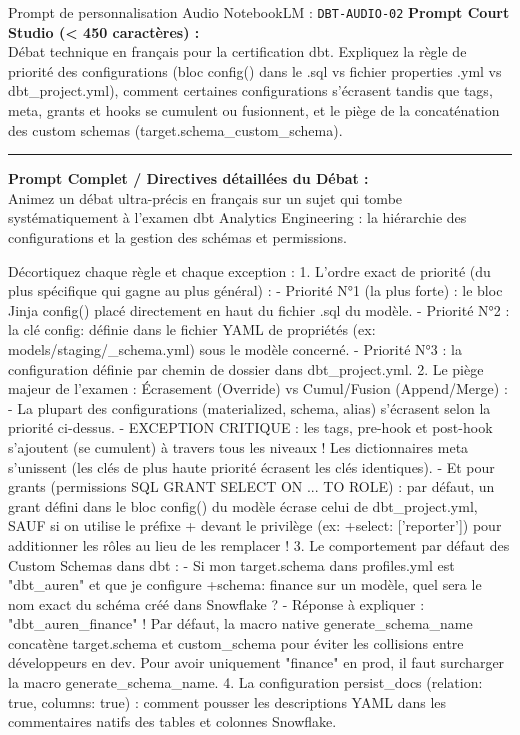 \documentclass[11pt,a4paper]{article}
\begin{document}
\begin{promptbox}{Prompt de personnalisation Audio NotebookLM : \texttt{DBT-AUDIO-02}}
\textbf{Prompt Court Studio (< 450 caractères) :}\\
Débat technique en français pour la certification dbt. Expliquez la règle de priorité des configurations (bloc config() dans le .sql vs fichier properties .yml vs dbt\_project.yml), comment certaines configurations s'écrasent tandis que tags, meta, grants et hooks se cumulent ou fusionnent, et le piège de la concaténation des custom schemas (target.schema\_custom\_schema).

\medskip\hrule\medskip
\textbf{Prompt Complet / Directives détaillées du Débat :}\\
Animez un débat ultra-précis en français sur un sujet qui tombe systématiquement à l'examen dbt Analytics Engineering : la hiérarchie des configurations et la gestion des schémas et permissions.

Décortiquez chaque règle et chaque exception :
1. L'ordre exact de priorité (du plus spécifique qui gagne au plus général) :
- Priorité N°1 (la plus forte) : le bloc Jinja config() placé directement en haut du fichier .sql du modèle.
- Priorité N°2 : la clé config: définie dans le fichier YAML de propriétés (ex: models/staging/\_schema.yml) sous le modèle concerné.
- Priorité N°3 : la configuration définie par chemin de dossier dans dbt\_project.yml.
2. Le piège majeur de l'examen : Écrasement (Override) vs Cumul/Fusion (Append/Merge) :
- La plupart des configurations (materialized, schema, alias) s'écrasent selon la priorité ci-dessus.
- EXCEPTION CRITIQUE : les tags, pre-hook et post-hook s'ajoutent (se cumulent) à travers tous les niveaux ! Les dictionnaires meta s'unissent (les clés de plus haute priorité écrasent les clés identiques).
- Et pour grants (permissions SQL GRANT SELECT ON ... TO ROLE) : par défaut, un grant défini dans le bloc config() du modèle écrase celui de dbt\_project.yml, SAUF si on utilise le préfixe + devant le privilège (ex: +select: ['reporter']) pour additionner les rôles au lieu de les remplacer !
3. Le comportement par défaut des Custom Schemas dans dbt :
- Si mon target.schema dans profiles.yml est "dbt\_auren" et que je configure +schema: finance sur un modèle, quel sera le nom exact du schéma créé dans Snowflake ?
- Réponse à expliquer : "dbt\_auren\_finance" ! Par défaut, la macro native generate\_schema\_name concatène target.schema et custom\_schema pour éviter les collisions entre développeurs en dev. Pour avoir uniquement "finance" en prod, il faut surcharger la macro generate\_schema\_name.
4. La configuration persist\_docs (relation: true, columns: true) : comment pousser les descriptions YAML dans les commentaires natifs des tables et colonnes Snowflake.
\end{promptbox}
\end{document}
